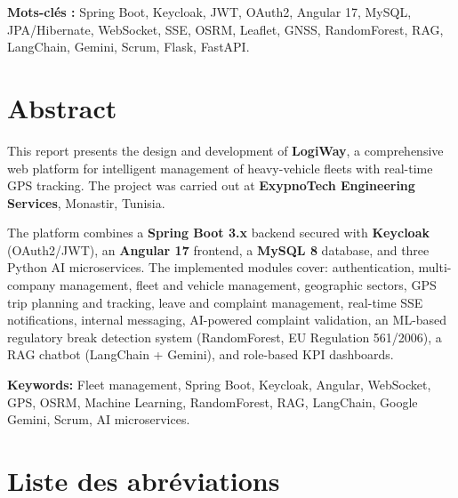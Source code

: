 \documentclass[12pt,a4paper]{report}
\begin{document}
\medskip
\textbf{Mots-clés :} Spring Boot, Keycloak, JWT, OAuth2, Angular 17,
MySQL, JPA/Hibernate, WebSocket, SSE, OSRM, Leaflet, GNSS, RandomForest,
RAG, LangChain, Gemini, Scrum, Flask, FastAPI.

\newpage

\chapter*{Abstract}

This report presents the design and development of \textbf{LogiWay}, a
comprehensive web platform for intelligent management of heavy-vehicle fleets
with real-time GPS tracking. The project was carried out at
\textbf{ExypnoTech Engineering Services}, Monastir, Tunisia.

The platform combines a \textbf{Spring Boot 3.x} backend secured with
\textbf{Keycloak} (OAuth2/JWT), an \textbf{Angular 17} frontend, a
\textbf{MySQL 8} database, and three Python AI microservices. The implemented
modules cover: authentication, multi-company management, fleet and vehicle
management, geographic sectors, GPS trip planning and tracking,
leave and complaint management, real-time SSE notifications, internal
messaging, AI-powered complaint validation, an ML-based regulatory break
detection system (RandomForest, EU Regulation 561/2006), a RAG chatbot
(LangChain + Gemini), and role-based KPI dashboards.

\medskip
\textbf{Keywords:} Fleet management, Spring Boot, Keycloak, Angular,
WebSocket, GPS, OSRM, Machine Learning, RandomForest, RAG, LangChain,
Google Gemini, Scrum, AI microservices.

\newpage

\chapter*{Liste des abréviations}
\end{document}

